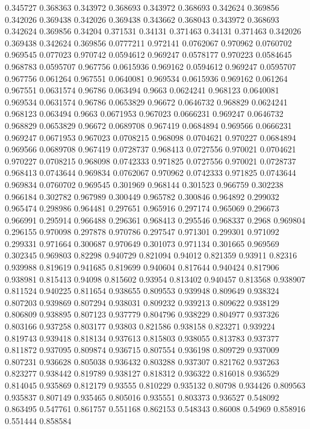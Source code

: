 0.345727 0.368363
0.343972 0.368693
0.343972 0.368693
0.342624 0.369856
0.342026 0.369438
0.342026 0.369438
0.343662 0.368043
0.343972 0.368693
0.342624 0.369856
0.34204 0.371531
0.34131 0.371463
0.34131 0.371463
0.342026 0.369438
0.342624 0.369856
0.0777211 0.972141
0.0762067 0.970962
0.0760702 0.969545
0.077023 0.970742
0.0594612 0.969247
0.0578177 0.970223
0.0584645 0.968783
0.0595707 0.967756
0.0615936 0.969162
0.0594612 0.969247
0.0595707 0.967756
0.061264 0.967551
0.0640081 0.969534
0.0615936 0.969162
0.061264 0.967551
0.0631574 0.96786
0.063494 0.9663
0.0624241 0.968123
0.0640081 0.969534
0.0631574 0.96786
0.0653829 0.96672
0.0646732 0.968829
0.0624241 0.968123
0.063494 0.9663
0.0671953 0.967023
0.0666231 0.969247
0.0646732 0.968829
0.0653829 0.96672
0.0689708 0.967419
0.0684894 0.969566
0.0666231 0.969247
0.0671953 0.967023
0.0708215 0.968098
0.0704621 0.970227
0.0684894 0.969566
0.0689708 0.967419
0.0728737 0.968413
0.0727556 0.970021
0.0704621 0.970227
0.0708215 0.968098
0.0742333 0.971825
0.0727556 0.970021
0.0728737 0.968413
0.0743644 0.969834
0.0762067 0.970962
0.0742333 0.971825
0.0743644 0.969834
0.0760702 0.969545
0.301969 0.968144
0.301523 0.966759
0.302238 0.966184
0.302782 0.967989
0.300449 0.965782
0.300846 0.964892
0.299032 0.965474
0.298986 0.964481
0.297651 0.965916
0.297174 0.965069
0.296673 0.966991
0.295914 0.966488
0.296361 0.968413
0.295546 0.968337
0.2968 0.969804
0.296155 0.970098
0.297878 0.970786
0.297547 0.971301
0.299301 0.971092
0.299331 0.971664
0.300687 0.970649
0.301073 0.971134
0.301665 0.969569
0.302345 0.969803
0.82298 0.940729
0.821094 0.94012
0.821359 0.93911
0.82316 0.939988
0.819619 0.941685
0.819699 0.940604
0.817644 0.940424
0.817906 0.938981
0.815413 0.94098
0.815602 0.93954
0.813402 0.940457
0.813568 0.938907
0.811524 0.940225
0.811654 0.938655
0.809553 0.939948
0.809649 0.938324
0.807203 0.939869
0.807294 0.938031
0.809232 0.939213
0.809622 0.938129
0.806809 0.938895
0.807123 0.937779
0.804796 0.938229
0.804977 0.937326
0.803166 0.937258
0.803177 0.93803
0.821586 0.938158
0.823271 0.939224
0.819743 0.939418
0.818134 0.937613
0.815803 0.938055
0.813783 0.937377
0.811872 0.937095
0.809874 0.936715
0.807554 0.936198
0.809729 0.937009
0.807231 0.936628
0.805038 0.936432
0.803288 0.937307
0.821762 0.937263
0.823277 0.938442
0.819789 0.938127
0.818312 0.936322
0.816018 0.936529
0.814045 0.935869
0.812179 0.93555
0.810229 0.935132
0.80798 0.934426
0.809563 0.935837
0.807149 0.935465
0.805016 0.935551
0.803373 0.936527
0.548092 0.863495
0.547761 0.861757
0.551168 0.862153
0.548343 0.86008
0.54969 0.858916
0.551444 0.858584
